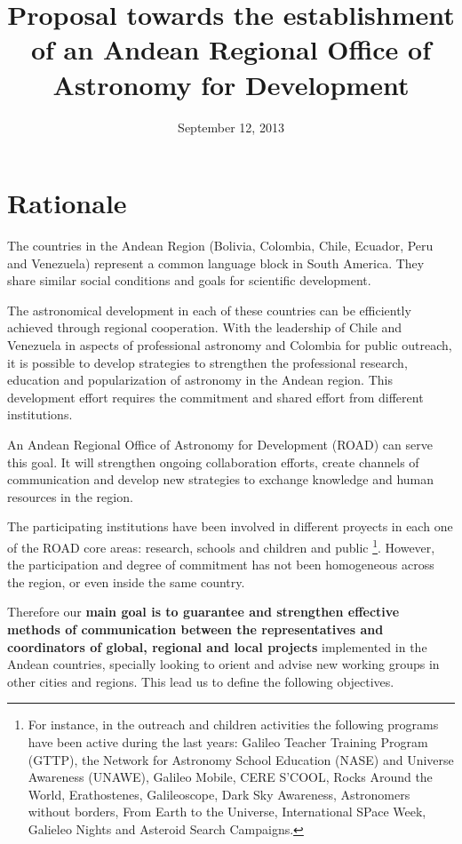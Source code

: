 \documentclass[12pt]{article}
\title{Proposal towards the establishment of an Andean Regional Office of
  Astronomy for Development}
\date{September 12, 2013}
\begin{document}
\maketitle
\tableofcontents
\newpage

\section{Rationale}

The countries in the Andean Region (Bolivia, Colombia, Chile, Ecuador,
Peru and Venezuela) represent a common language block in South
America. They share similar social conditions and goals for scientific
development.  

The astronomical development in each of these countries can be
efficiently achieved through regional cooperation. With the leadership
of Chile and Venezuela in aspects of professional astronomy and
Colombia for public outreach, it is possible to develop strategies to
strengthen the professional research, education and popularization of
astronomy in the Andean region. This development effort requires the
commitment and shared effort from different institutions. 

An Andean Regional Office of Astronomy for Development (ROAD) can
serve this goal.  It will strengthen ongoing collaboration efforts,
create channels of communication and develop new strategies to
exchange knowledge and human resources in the region.  


The participating institutions have been involved in different
proyects in each one of the ROAD core areas: research, schools and
children and public \footnote{For instance, in the outreach and children activities
  the following programs have been active during the last years: Galileo Teacher Training
  Program (GTTP), the Network for Astronomy School Education (NASE)
  and Universe Awareness (UNAWE), Galileo Mobile, CERE S'COOL, Rocks
  Around the World, Erathostenes, Galileoscope, Dark Sky Awareness,
  Astronomers without borders, From Earth to the Universe,
  International SPace Week, Galieleo Nights and Asteroid Search
  Campaigns.}. However, the participation and degree of commitment
has not been homogeneous across the region, or even inside the same
country. 

Therefore our {\bf main goal is to guarantee and strengthen effective
  methods of communication between the representatives and
  coordinators of global, regional and local projects} implemented  in
the Andean countries, specially looking to orient and advise new
working groups in  other cities and regions. This lead us to define
the following objectives.
\end{document}
